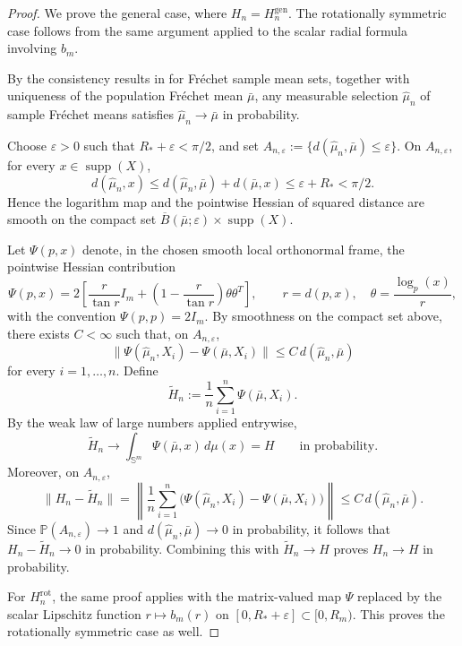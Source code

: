 \documentclass{amsart}
\theoremstyle{definition}
\theoremstyle{remark}
\newcommand\0{\boldsymbol{0}}
\begin{document}
\begin{proof}
We prove the general case, where \(H_n=H_n^{\mathrm{gen}}\). The rotationally symmetric case follows from the same argument applied to the scalar radial formula involving \(b_m\).

By the consistency results in \citet{Ziezold1977} for Fréchet sample mean sets, together with uniqueness of the population Fréchet mean \(\bar\mu\), any measurable selection \(\hat\mu_n\) of sample Fréchet means satisfies \(\hat\mu_n\to\bar\mu\) in probability.

Choose \(\varepsilon>0\) such that \(R_\ast+\varepsilon<\pi/2\), and set
\(
A_{n,\varepsilon}:=\{d(\hat\mu_n,\bar\mu)\le \varepsilon\}.
\)
On \(A_{n,\varepsilon}\), for every \(x\in\operatorname{supp}(X)\),
\[
d(\hat\mu_n,x)\le d(\hat\mu_n,\bar\mu)+d(\bar\mu,x)
\le \varepsilon+R_\ast<\pi/2.
\]
Hence the logarithm map and the pointwise Hessian of squared distance are smooth on the compact set
\(
\overline B(\bar\mu;\varepsilon)\times \operatorname{supp}(X).
\)

Let \(\Psi(p,x)\) denote, in the chosen smooth local orthonormal frame, the pointwise Hessian contribution
\[
\Psi(p,x)
=
2\left[
\frac{r}{\tan r}I_m+
\left(1-\frac{r}{\tan r}\right)\theta\theta^T
\right],
\qquad
r=d(p,x),\quad \theta=\frac{\log_p(x)}{r},
\]
with the convention \(\Psi(p,p)=2I_m\). By smoothness on the compact set above, there exists \(C<\infty\) such that, on \(A_{n,\varepsilon}\),
\[
\|\Psi(\hat\mu_n,X_i)-\Psi(\bar\mu,X_i)\|
\le C\,d(\hat\mu_n,\bar\mu)
\]
for every \(i=1,\dots,n\). Define
\[
\widetilde H_n:=\frac1n\sum_{i=1}^n \Psi(\bar\mu,X_i).
\]
By the weak law of large numbers applied entrywise,
\[
\widetilde H_n\to \int_{\mathbb S^m}\Psi(\bar\mu,x)\,d\mu(x)=H
\qquad\text{in probability}.
\]
Moreover, on \(A_{n,\varepsilon}\),
\[
\|H_n-\widetilde H_n\|
=
\left\|
\frac1n\sum_{i=1}^n
\bigl(\Psi(\hat\mu_n,X_i)-\Psi(\bar\mu,X_i)\bigr)
\right\|
\le C\,d(\hat\mu_n,\bar\mu).
\]
Since \(\mathbb P(A_{n,\varepsilon})\to1\) and \(d(\hat\mu_n,\bar\mu)\to0\) in probability, it follows that \(H_n-\widetilde H_n\to0\) in probability. Combining this with \(\widetilde H_n\to H\) proves \(H_n\to H\) in probability.

For \(H_n^{\mathrm{rot}}\), the same proof applies with the matrix-valued map \(\Psi\) replaced by the scalar Lipschitz function \(r\mapsto b_m(r)\) on \([0,R_\ast+\varepsilon]\subset[0,R_m)\). This proves the rotationally symmetric case as well.
\end{proof}
\end{document}
